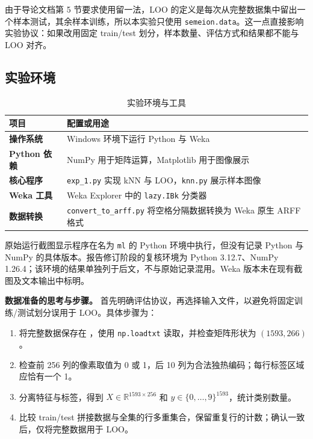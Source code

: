 \documentclass[UTF8,zihao=-4]{ctexart}
\begin{document}
由于导论文档第 5 节要求使用留一法，LOO 的定义是每次从完整数据集中留出一个样本测试，其余样本训练，所以本实验只使用 \texttt{semeion.data}。这一点直接影响实验协议：如果改用固定 train/test 划分，样本数量、评估方式和结果都不能与 LOO 对齐。

\subsection{实验环境}

\begin{table}[H]
  \centering
  \caption{实验环境与工具}
  \label{tab:env}
  \begin{tabularx}{\textwidth}{>{\bfseries}l X}
    \toprule
    项目 & 配置或用途 \\
    \midrule
    操作系统 & Windows 环境下运行 Python 与 Weka \\
    Python 依赖 & NumPy 用于矩阵运算，Matplotlib 用于图像展示 \\
    核心程序 & \texttt{exp\_1.py} 实现 kNN 与 LOO，\texttt{knn.py} 展示样本图像 \\
    Weka 工具 & Weka Explorer 中的 \texttt{lazy.IBk} 分类器 \\
    数据转换 & \texttt{convert\_to\_arff.py} 将空格分隔数据转换为 Weka 原生 ARFF 格式 \\
    \bottomrule
  \end{tabularx}
\end{table}

原始运行截图显示程序在名为 \texttt{ml} 的 Python 环境中执行，但没有记录 Python 与 NumPy 的具体版本。报告修订阶段的复核环境为 Python 3.12.7、NumPy 1.26.4；该环境的结果单独列于后文，不与原始记录混用。Weka 版本未在现有截图及文本输出中标明。

\textbf{数据准备的思考与步骤。} 首先明确评估协议，再选择输入文件，以避免将固定训练/测试划分误用于 LOO。具体步骤为：
\begin{enumerate}[label=\arabic*.]
  \item 将完整数据保存在 ，使用 \texttt{np.loadtxt} 读取，并检查矩阵形状为 $(1593,266)$。
  \item 检查前 256 列的像素取值为 0 或 1，后 10 列为合法独热编码；每行标签区域应恰有一个 1。
  \item 分离特征与标签，得到 $X\in\mathbb{R}^{1593\times256}$ 和 $y\in\{0,\ldots,9\}^{1593}$，统计类别数量。
  \item 比较 train/test 拼接数据与全集的行多重集合，保留重复行的计数；确认一致后，仅将完整数据用于 LOO。
\end{enumerate}
\end{document}
